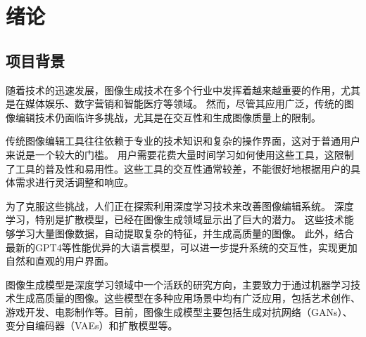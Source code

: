 \documentclass[a4paper,AutoFakeBold,oneside,12pt]{book}
\begin{document}
\blankmatter
  

\blankmatter
  

\blankmatter
  

\blankmatter
 


\frontmatter
\tableofcontents %

\newpage\mainmatter
{}



\chapter{绪论} %
\section{项目背景}
随着技术的迅速发展，图像生成技术在多个行业中发挥着越来越重要的作用，尤其是在媒体娱乐、数字营销和智能医疗等领域。
然而，尽管其应用广泛，传统的图像编辑技术仍面临许多挑战，尤其是在交互性和生成图像质量上的限制。

传统图像编辑工具往往依赖于专业的技术知识和复杂的操作界面，这对于普通用户来说是一个较大的门槛。
用户需要花费大量时间学习如何使用这些工具，这限制了工具的普及性和易用性。这些工具的交互性通常较差，不能很好地根据用户的具体需求进行灵活调整和响应。

为了克服这些挑战，人们正在探索利用深度学习技术来改善图像编辑系统。
深度学习，特别是扩散模型，已经在图像生成领域显示出了巨大的潜力。
这些技术能够学习大量图像数据，自动提取复杂的特征，并生成高质量的图像。
此外，结合最新的GPT4等性能优异的大语言模型，可以进一步提升系统的交互性，实现更加自然和直观的用户界面。

图像生成模型是深度学习领域中一个活跃的研究方向，主要致力于通过机器学习技术生成高质量的图像。这些模型在多种应用场景中均有广泛应用，包括艺术创作、游戏开发、电影制作等。目前，图像生成模型主要包括生成对抗网络（GANs）、变分自编码器（VAEs）和扩散模型等。
\end{document}
